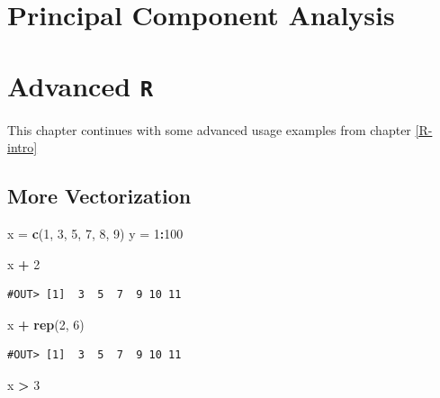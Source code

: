 \documentclass[]{book}
\newenvironment{Shaded}{\begin{snugshade}}{\end{snugshade}}
\newcommand{\KeywordTok}[1]{\textcolor[rgb]{0.13,0.29,0.53}{\textbf{#1}}}
\newcommand{\DecValTok}[1]{\textcolor[rgb]{0.00,0.00,0.81}{#1}}
\newcommand{\StringTok}[1]{\textcolor[rgb]{0.31,0.60,0.02}{#1}}
\newcommand{\OperatorTok}[1]{\textcolor[rgb]{0.81,0.36,0.00}{\textbf{#1}}}
\newcommand{\NormalTok}[1]{#1}
\theoremstyle{definition}
\theoremstyle{definition}
\theoremstyle{definition}
\theoremstyle{remark}
\begin{document}
\chapter{Principal Component Analysis}\label{pca}

\chapter{\texorpdfstring{Advanced
\texttt{R}}{Advanced R}}\label{R-advanced}

This chapter continues with some advanced usage examples from chapter
\ref{R-intro}

\section{More Vectorization}\label{more-vectorization}

\begin{Shaded}
\begin{Highlighting}[]
\NormalTok{x =}\StringTok{ }\KeywordTok{c}\NormalTok{(}\DecValTok{1}\NormalTok{, }\DecValTok{3}\NormalTok{, }\DecValTok{5}\NormalTok{, }\DecValTok{7}\NormalTok{, }\DecValTok{8}\NormalTok{, }\DecValTok{9}\NormalTok{)}
\NormalTok{y =}\StringTok{ }\DecValTok{1}\OperatorTok{:}\DecValTok{100}
\end{Highlighting}
\end{Shaded}

\begin{Shaded}
\begin{Highlighting}[]
\NormalTok{x }\OperatorTok{+}\StringTok{ }\DecValTok{2}
\end{Highlighting}
\end{Shaded}

\begin{verbatim}
#OUT> [1]  3  5  7  9 10 11
\end{verbatim}

\begin{Shaded}
\begin{Highlighting}[]
\NormalTok{x }\OperatorTok{+}\StringTok{ }\KeywordTok{rep}\NormalTok{(}\DecValTok{2}\NormalTok{, }\DecValTok{6}\NormalTok{)}
\end{Highlighting}
\end{Shaded}

\begin{verbatim}
#OUT> [1]  3  5  7  9 10 11
\end{verbatim}

\begin{Shaded}
\begin{Highlighting}[]
\NormalTok{x }\OperatorTok{>}\StringTok{ }\DecValTok{3}
\end{Highlighting}
\end{Shaded}
\end{document}
